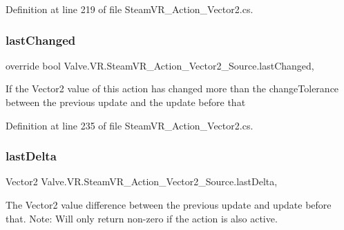 Definition at line 219 of file Steam\+V\+R\+\_\+\+Action\+\_\+\+Vector2.\+cs.

\mbox{\label{class_valve_1_1_v_r_1_1_steam_v_r___action___vector2___source_a3e6454ab7f3a17f060cc13cee5b47791}} 
\subsubsection{\texorpdfstring{lastChanged}{lastChanged}}
{\footnotesize\ttfamily override bool Valve.\+V\+R.\+Steam\+V\+R\+\_\+\+Action\+\_\+\+Vector2\+\_\+\+Source.\+last\+Changed\hspace{0.3cm}{\ttfamily [get]}, {}}



If the Vector2 value of this action has changed more than the change\+Tolerance between the previous update and the update before that 



Definition at line 235 of file Steam\+V\+R\+\_\+\+Action\+\_\+\+Vector2.\+cs.

\mbox{\label{class_valve_1_1_v_r_1_1_steam_v_r___action___vector2___source_ad85707f63e96209405cb1b2a67ffb1dc}} 
\subsubsection{\texorpdfstring{lastDelta}{lastDelta}}
{\footnotesize\ttfamily Vector2 Valve.\+V\+R.\+Steam\+V\+R\+\_\+\+Action\+\_\+\+Vector2\+\_\+\+Source.\+last\+Delta\hspace{0.3cm}{\ttfamily [get]}, {}}



The Vector2 value difference between the previous update and update before that. Note\+: Will only return non-\/zero if the action is also active. 




